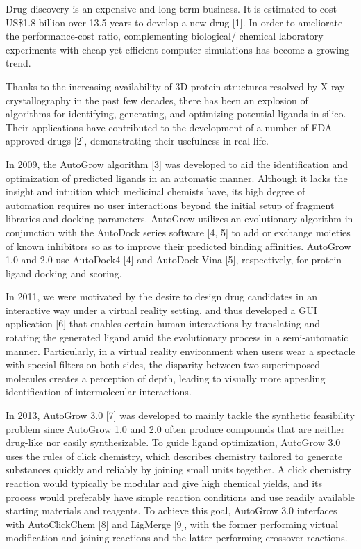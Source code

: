 Drug discovery is an expensive and long-term business. It is estimated to cost US\$1.8 billion over 13.5 years to develop a new drug [1]. In order to ameliorate the performance-cost ratio, complementing biological/ chemical laboratory experiments with cheap yet efficient computer simulations has become a growing trend.

Thanks to the increasing availability of 3D protein structures resolved by X-ray crystallography in the past few decades, there has been an explosion of algorithms for identifying, generating, and optimizing potential ligands in silico. Their applications have contributed to the development of a number of FDA-approved drugs [2], demonstrating their usefulness in real life.

In 2009, the AutoGrow algorithm [3] was developed to aid the identification and optimization of predicted ligands in an automatic manner. Although it lacks the insight and intuition which medicinal chemists have, its high degree of automation requires no user interactions beyond the initial setup of fragment libraries and docking parameters. AutoGrow utilizes an evolutionary algorithm in conjunction with the AutoDock series software [4, 5] to add or exchange moieties of known inhibitors so as to improve their predicted binding affinities. AutoGrow 1.0 and 2.0 use AutoDock4 [4] and AutoDock Vina [5], respectively, for protein-ligand docking and scoring.

In 2011, we were motivated by the desire to design drug candidates in an interactive way under a virtual reality setting, and thus developed a GUI application [6] that enables certain human interactions by translating and rotating the generated ligand amid the evolutionary process in a semi-automatic manner. Particularly, in a virtual reality environment when users wear a spectacle with special filters on both sides, the disparity between two superimposed molecules creates a perception of depth, leading to visually more appealing identification of intermolecular interactions.

In 2013, AutoGrow 3.0 [7] was developed to mainly tackle the synthetic feasibility problem since AutoGrow 1.0 and 2.0 often produce compounds that are neither drug-like nor easily synthesizable. To guide ligand optimization, AutoGrow 3.0 uses the rules of click chemistry, which describes chemistry tailored to generate substances quickly and reliably by joining small units together. A click chemistry reaction would typically be modular and give high chemical yields, and its process would preferably have simple reaction conditions and use readily available starting materials and reagents. To achieve this goal, AutoGrow 3.0 interfaces with AutoClickChem [8] and LigMerge [9], with the former performing virtual modification and joining reactions and the latter performing crossover reactions.


